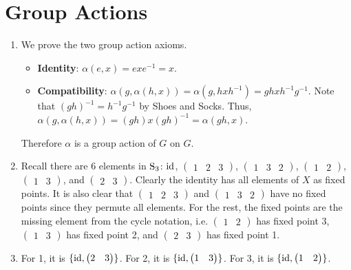 \section{Group Actions}
\begin{enumerate}
    \item We prove the two group action axioms.
    \begin{itemize}
        \item \textbf{Identity}: $\alpha(e, x) = exe^{-1} = x$.
        \item \textbf{Compatibility}: $\alpha(g, \alpha(h, x)) = \alpha(g, hxh^{-1}) = ghxh^{-1}g^{-1}$. Note that $(gh)^{-1} = h^{-1}g^{-1}$ by Shoes and Socks. Thus, $\alpha(g, \alpha(h, x)) = (gh)x(gh)^{-1} = \alpha(gh, x)$.
    \end{itemize}
    Therefore $\alpha$ is a group action of $G$ on $G$.

    \item Recall there are 6 elements in $\mathrm{S}_{3}$: $\mathrm{id}$, $\begin{pmatrix}1 & 2 & 3\end{pmatrix}$, $\begin{pmatrix}1 & 3 & 2\end{pmatrix}$, $\begin{pmatrix}1 & 2\end{pmatrix}$, $\begin{pmatrix}1 & 3\end{pmatrix}$, and $\begin{pmatrix}2 & 3\end{pmatrix}$. Clearly the identity has all elements of $X$ as fixed points. It is also clear that $\begin{pmatrix}1 & 2 & 3\end{pmatrix}$ and $\begin{pmatrix}1 & 3 & 2\end{pmatrix}$ have no fixed points since they permute all elements. For the rest, the fixed points are the missing element from the cycle notation, i.e. $\begin{pmatrix}1 & 2\end{pmatrix}$ has fixed point 3, $\begin{pmatrix}1 & 3\end{pmatrix}$ has fixed point 2, and $\begin{pmatrix}2 & 3\end{pmatrix}$ has fixed point 1.

    \item For 1, it is $\{\mathrm{id}, \begin{pmatrix}2 & 3\end{pmatrix}\}$. For 2, it is $\{\mathrm{id}, \begin{pmatrix}1 & 3\end{pmatrix}\}$. For 3, it is $\{\mathrm{id}, \begin{pmatrix}1 & 2\end{pmatrix}\}$.


\end{enumerate}
